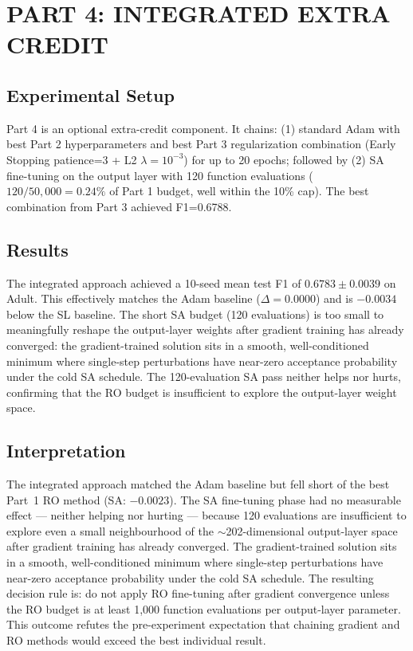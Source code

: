 \documentclass[letterpaper, 10 pt, conference]{ieeeconf}
\begin{document}
\section{PART 4: INTEGRATED EXTRA CREDIT}

\subsection{Experimental Setup}

Part 4 is an optional extra-credit component. It chains: (1) standard Adam with best Part 2 hyperparameters and best Part 3 regularization combination (Early Stopping patience=3 + L2 $\lambda=10^{-3}$) for up to 20 epochs; followed by (2) SA fine-tuning on the output layer with 120 function evaluations ($120/50{,}000 = 0.24\%$ of Part 1 budget, well within the 10\% cap). The best combination from Part 3 achieved F1=0.6788.

\subsection{Results}

The integrated approach achieved a 10-seed mean test F1 of $0.6783 \pm 0.0039$ on Adult. This effectively matches the Adam baseline ($\Delta = 0.0000$) and is $-0.0034$ below the SL baseline. The short SA budget (120 evaluations) is too small to meaningfully reshape the output-layer weights after gradient training has already converged: the gradient-trained solution sits in a smooth, well-conditioned minimum where single-step perturbations have near-zero acceptance probability under the cold SA schedule. The 120-evaluation SA pass neither helps nor hurts, confirming that the RO budget is insufficient to explore the output-layer weight space.

\subsection{Interpretation}

The integrated approach matched the Adam baseline but fell short of the best Part~1 RO method (SA: $-0.0023$). The SA fine-tuning phase had no measurable effect --- neither helping nor hurting --- because 120 evaluations are insufficient to explore even a small neighbourhood of the $\sim$202-dimensional output-layer space after gradient training has already converged. The gradient-trained solution sits in a smooth, well-conditioned minimum where single-step perturbations have near-zero acceptance probability under the cold SA schedule. The resulting decision rule is: do not apply RO fine-tuning after gradient convergence unless the RO budget is at least 1{,}000 function evaluations per output-layer parameter. This outcome refutes the pre-experiment expectation that chaining gradient and RO methods would exceed the best individual result.
\end{document}
